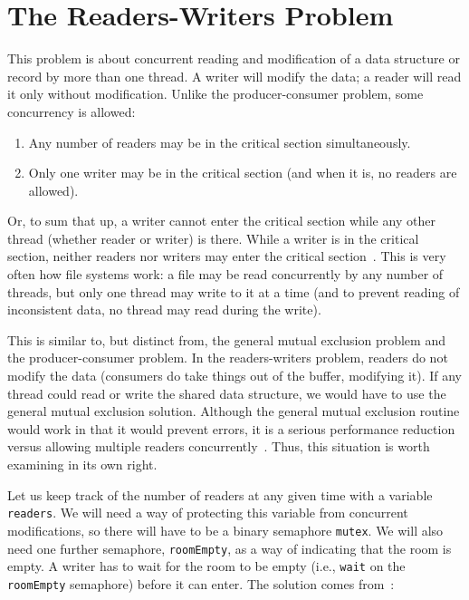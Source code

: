 




\section*{The Readers-Writers Problem}

This problem is about concurrent reading and modification of a data structure or record by more than one thread. A writer will modify the data; a reader will read it only without modification. Unlike the producer-consumer problem, some concurrency is allowed:

\begin{enumerate}
\item Any number of readers may be in the critical section simultaneously.
\item Only one writer may be in the critical section (and when it is, no readers are allowed).
\end{enumerate}

Or, to sum that up, a writer cannot enter the critical section while any other thread (whether reader or writer) is there. While a writer is in the critical section, neither readers nor writers may enter the critical section~\cite{lbs}. This is very often how file systems work: a file may be read concurrently by any number of threads, but only one thread may write to it at a time (and to prevent reading of inconsistent data, no thread may read during the write).

This is similar to, but distinct from, the general mutual exclusion problem and the producer-consumer problem. In the readers-writers problem, readers do not modify the data (consumers do take things out of the buffer, modifying it). If any thread could read or write the shared data structure, we would have to use the general mutual exclusion solution. Although the general mutual exclusion routine would work in that it would prevent errors, it is a serious performance reduction versus allowing multiple readers concurrently~\cite{osi}. Thus, this situation is worth examining in its own right.

Let us keep track of the number of readers at any given time with a variable \texttt{readers}. We will need a way of protecting this variable from concurrent modifications, so there will have to be a binary semaphore \texttt{mutex}. We will also need one further semaphore, \texttt{roomEmpty}, as a way of indicating that the room is empty. A writer has to wait for the room to be empty (i.e., \texttt{wait} on the \texttt{roomEmpty} semaphore) before it can enter. The solution comes from~\cite{lbs}:

